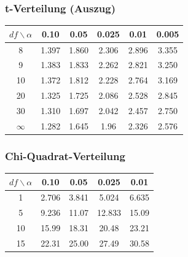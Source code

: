 \documentclass[10pt, a4paper, ngerman]{scrartcl}
\begin{document}
\subsubsection{t-Verteilung (Auszug)}

\begin{tabular}{cccccc}
  $df \backslash \alpha$ & 0.10 & 0.05 & 0.025 & 0.01 & 0.005 \\
  \hline
  8 & 1.397 & 1.860 & 2.306 & 2.896 & 3.355 \\
  9 & 1.383 & 1.833 & 2.262 & 2.821 & 3.250 \\
  10 & 1.372 & 1.812 & 2.228 & 2.764 & 3.169 \\
  20 & 1.325 & 1.725 & 2.086 & 2.528 & 2.845 \\
  30 & 1.310 & 1.697 & 2.042 & 2.457 & 2.750 \\
  $\infty$ & 1.282 & 1.645 & 1.96 & 2.326 & 2.576 \\
\end{tabular}

\subsubsection{Chi-Quadrat-Verteilung}

\begin{tabular}{ccccc}
  $df \backslash \alpha$ & 0.10 & 0.05 & 0.025 & 0.01 \\
  \hline
  1 & 2.706 & 3.841 & 5.024 & 6.635 \\
  5 & 9.236 & 11.07 & 12.833 & 15.09 \\
  10 & 15.99 & 18.31 & 20.48 & 23.21 \\
  15 & 22.31 & 25.00 & 27.49 & 30.58 \\
\end{tabular}
\end{document}
